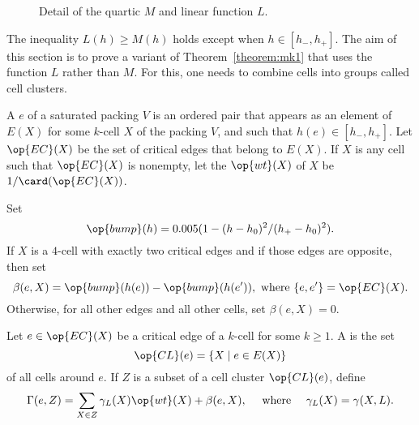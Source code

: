 \begin{figure}[htb]
\centering
{}
\caption{Detail of the quartic $M$ and linear function $L$.}
\label{fig:L}
\end{figure}

The inequality $L(h)\ge M(h)$ holds except when $h\in [h_-,h_+]$.  The
aim of this section is to prove a variant of Theorem~\ref{theorem:mk1}
that uses the function $L$ rather than $M$.  For this, one needs to
combine cells into groups called cell clusters.

\begin{definition}\label{def:wt}
A  $e$ of a saturated packing $V$ is an ordered pair
that appears as an element of $E(X)$ for some 
$k$-cell $X$ of the packing $V$, and such that
$h(e)\in[h_-,h_+]$.  Let $\op{EC}(X)$ 
be the set of critical edges that belong to $E(X)$.  If $X$ is any cell such
that $\op{EC}(X)$ is nonempty, let the  $\op{wt}(X)$ of $X$ be
$1/\card(\op{EC}(X))$.
\end{definition}
%
%
%

\begin{definition} \label{def:beta}
Set 
\begin{displaymath}
\op{bump}(h) = 0.005 (1 - (h-h_0)^2/(h_+-h_0)^2).
\end{displaymath}
If $X$ is a $4$-cell with exactly two critical edges and if those edges
are opposite, then set
\begin{displaymath}
\beta(e,X) = \op{bump}(h(e)) - \op{bump}(h(e')), \text{ where } \{e,e'\} = \op{EC}(X).  
\end{displaymath}
Otherwise, for all other edges and all other cells, set $\beta(e,X) = 0$.
\end{definition}
%
%

\begin{definition}\label{def:gammaL}
Let $e\in \op{EC}(X)$ be a critical edge of a $k$-cell for some $k\ge 1$.
A  is the set 
\begin{displaymath}
\op{CL}(e) = \{X\mid e\in E(X)\} 
\end{displaymath}
%
of all cells around $e$. 
If $Z$ is a subset of a cell cluster $\op{CL}(e)$, define
%
%
\begin{displaymath}
\Gamma(e,Z) = \sum_{X\in Z} \gamma_L(X) \op{wt}(X) +\beta(e,X),\quad\hbox{ where }\quad
\gamma_L(X) = \gamma(X,L).
\end{displaymath}
%
%

\end{definition}
%

